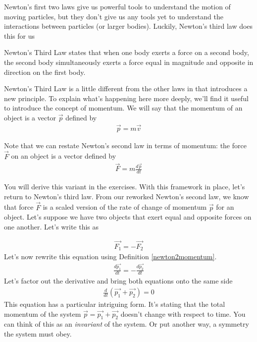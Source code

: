 \documentclass[book.tex]{subfiles}
\begin{document}
Newton's first two laws give us powerful tools to understand the motion of moving particles, but they don't give us any tools yet to understand the interactions between particles (or larger bodies). Luckily, Newton's third law does this for us

Newton's Third Law states that when one body exerts a force on a second body, the second body simultaneously exerts a force equal in magnitude and opposite in direction on the first body.

Newton's Third Law is a little different from the other laws in that introduces a new principle. To explain what's happening here more deeply, we'll find it useful to introduce the concept of momentum. We will say that the momentum of an object is a vector $\vec{p}$ defined by \begin{align}
\vec{p} = m\vec{v}
\end{align}


Note that we can restate Newton's second law in terms of momentum: the force $\vec{F}$ on an object is a vector defined by
\begin{align}
    \vec{F} = m \frac{d \vec{p}}{dt}
\end{align}
\label{newton2momentum}

You will derive this variant in the exercises. With this framework in place, let's return to Newton's third law. From our reworked Newton's second law, we know that force $\vec{F}$ is a scaled version of the rate of change of momentum $\vec{p}$ for an object. Let's suppose we have two objects that exert equal and opposite forces on one another. Let's write this as 

\begin{align}
    \vec{F_1} = -\vec{F_2} 
\end{align}
Let's now rewrite this equation using Definition \ref{newton2momentum}.
\begin{align}
\frac{d\vec{p_1}}{dt} = -\frac{d\vec{p_2}}{dt}
\end{align}
Let's factor out the derivative and bring both equations onto the same side
\begin{align}
    \frac{d}{dt}(\vec{p_1} + \vec{p_2}) = 0
\end{align}
This equation has a particular intriguing form. It's stating that the total momentum of the system $\vec{p} = \vec{p_1} + \vec{p_2}$ doesn't change with respect to time. You can think of this as an \textit{invariant} of the system. Or put another way, a symmetry the system must obey. 
\end{document}
